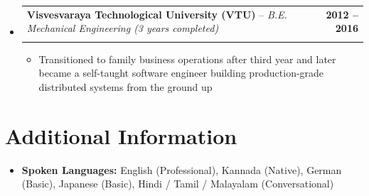 \documentclass[letterpaper,10.5pt]{article}
\makeatletter
\newcommand{\resumeItem}[1]{
  \item\small{#1\vspace{1pt}}
}
\newcommand{\resumeRole}[4]{
  \vspace{-1pt}\item[]
    \begin{tabular*}{\textwidth}{l@{\extracolsep{\fill}}r}
      \textbf{#1} -- \textit{#3} & \textbf{#2}\\
      \small #4 &  \\
    \end{tabular*}\vspace{-4pt}
}
\newcommand{\resumeListStart}{\begin{itemize}[leftmargin=0in, label={}]}
\newcommand{\resumeListEnd}{\end{itemize}\vspace{-4pt}}
\newcommand{\bulletListStart}{\begin{itemize}[leftmargin=0.2in, itemsep=0pt, topsep=1pt]}
\newcommand{\bulletListEnd}{\end{itemize}\vspace{2pt}}
\makeatother
\begin{document}
\resumeListStart
  \resumeRole
    {Visvesvaraya Technological University (VTU)}{2012 -- 2016}
    {B.E. Mechanical Engineering (3 years completed)}{}
  \bulletListStart
    \resumeItem{Transitioned to family business operations after third year and later became a self-taught software engineer building production-grade distributed systems from the ground up}
  \bulletListEnd
\resumeListEnd

\section{Additional Information}

\resumeListStart
  \item[]\textbf{Spoken Languages:} English (Professional), Kannada (Native), German (Basic), Japanese (Basic), Hindi / Tamil / Malayalam (Conversational)
\resumeListEnd

\end{document}
